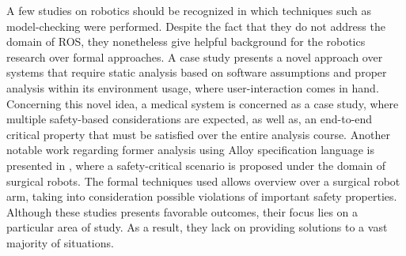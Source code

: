 A few studies on robotics should be recognized in which techniques such as model-checking were performed. Despite the fact that they do not address the domain of ROS, they nonetheless give helpful background for the robotics research over formal approaches. A case study \cite{near2011lightweight} presents a novel approach over systems that require static analysis based on software assumptions and proper analysis within its environment usage, where user-interaction comes in hand. Concerning this novel idea, a medical system is concerned as a case study, where multiple safety-based considerations are expected, as well as, an end-to-end critical property that must be satisfied over the entire analysis course. Another notable work regarding former analysis using Alloy specification language is presented in \cite{mansoor2018modeling}, where a safety-critical scenario is proposed under the domain of surgical robots. The formal techniques used allows overview over a surgical robot arm, taking into consideration possible violations of important safety properties. Although these studies presents favorable outcomes, their focus lies on a particular area of study. As a result, they lack on providing solutions to a vast majority of situations.